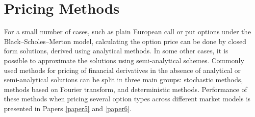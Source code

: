 \documentclass{UUThesisTemplate}
\begin{document}
\section{Pricing Methods}
\label{sec:methods}
\par For a small number of cases, such as plain European call or put options under the Black--Scholes--Merton model, calculating the option price can be done by closed form solutions, derived using analytical methods. In some other cases, it is possible to approximate the solutions using semi-analytical schemes. Commonly used methods for pricing of financial derivatives in the absence of analytical or semi-analytical solutions can be split in three main groups: stochastic methods, methods based on Fourier transform, and deterministic methods. Performance of these methods when pricing several option types across different market models is presented in Papers \ref{paper5} and \ref{paper6}.%
%
\end{document}
